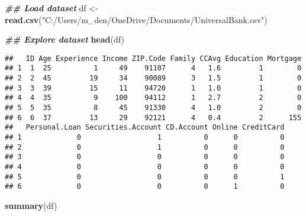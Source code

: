 \documentclass[
]{article}
\newenvironment{Shaded}{\begin{snugshade}}{\end{snugshade}}
\newcommand{\DocumentationTok}[1]{\textcolor[rgb]{0.56,0.35,0.01}{\textbf{\textit{#1}}}}
\newcommand{\FunctionTok}[1]{\textcolor[rgb]{0.13,0.29,0.53}{\textbf{#1}}}
\newcommand{\NormalTok}[1]{#1}
\newcommand{\OtherTok}[1]{\textcolor[rgb]{0.56,0.35,0.01}{#1}}
\newcommand{\StringTok}[1]{\textcolor[rgb]{0.31,0.60,0.02}{#1}}
\begin{document}
\begin{Shaded}
\begin{Highlighting}[]
\DocumentationTok{\#\# Load dataset}
\NormalTok{df }\OtherTok{\textless{}{-}} \FunctionTok{read.csv}\NormalTok{(}\StringTok{"C:/Users/m\_den/OneDrive/Documents/UniversalBank.csv"}\NormalTok{)}
\end{Highlighting}
\end{Shaded}

\begin{Shaded}
\begin{Highlighting}[]
\DocumentationTok{\#\# Explore dataset}
\FunctionTok{head}\NormalTok{(df)}
\end{Highlighting}
\end{Shaded}

\begin{verbatim}
##   ID Age Experience Income ZIP.Code Family CCAvg Education Mortgage
## 1  1  25          1     49    91107      4   1.6         1        0
## 2  2  45         19     34    90089      3   1.5         1        0
## 3  3  39         15     11    94720      1   1.0         1        0
## 4  4  35          9    100    94112      1   2.7         2        0
## 5  5  35          8     45    91330      4   1.0         2        0
## 6  6  37         13     29    92121      4   0.4         2      155
##   Personal.Loan Securities.Account CD.Account Online CreditCard
## 1             0                  1          0      0          0
## 2             0                  1          0      0          0
## 3             0                  0          0      0          0
## 4             0                  0          0      0          0
## 5             0                  0          0      0          1
## 6             0                  0          0      1          0
\end{verbatim}

\begin{Shaded}
\begin{Highlighting}[]
\FunctionTok{summary}\NormalTok{(df)}
\end{Highlighting}
\end{Shaded}
\end{document}
